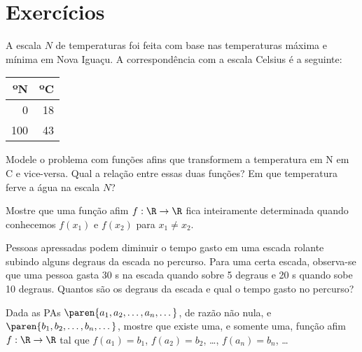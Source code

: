 \section{Exercícios}

\begin{exercise}
A escala $N$ de temperaturas foi feita com base nas temperaturas máxima e mínima em Nova Iguaçu. 
A correspondência com a escala Celsius é a seguinte:
%
\begin{center}
\begin{tabular}{|r|r|}
  \hline
  ºN & ºC \\ \hline
  0 & 18 \\ \hline
  100 & 43 \\ \hline
\end{tabular}
\end{center}
Modele o problema com funções afins que transformem a temperatura em
\tdeg N em \tdeg C e vice-versa. Qual a relação entre essas duas funções? Em
que temperatura ferve a água na escala $N$?
\end{exercise}

\begin{exercise}
\label{exer:determinicidade-funcao-afim}
Mostre que uma função afim $f: \R \to \R$ fica inteiramente
determinada quando conhecemos $f(x_1)$ e $f(x_2)$ para $x_1 \neq
x_2$.
\end{exercise}

\begin{exercise}
Pessoas apressadas podem diminuir o tempo gasto em uma escada
rolante subindo alguns degraus da escada no percurso. Para uma certa
escada, observa-se que uma pessoa gasta 30 s na escada quando
sobre 5 degraus e 20 s quando sobe 10 degraus. Quantos são os
degraus da escada e qual o tempo gasto no percurso?
\end{exercise}

\begin{exercise}
    Dada as PAs $\paren{a_1, a_2, \dots, a_n, \dots}$, de razão não
nula, e $\paren{b_1, b_2, \dots, b_n, \dots}$, mostre que existe
uma, e somente uma, função afim $f: \R \to \R$ tal que $f(a_1) =
b_1$, $f(a_2) = b_2$, \dots , $f(a_n) = b_n$, \dots
\end{exercise}

